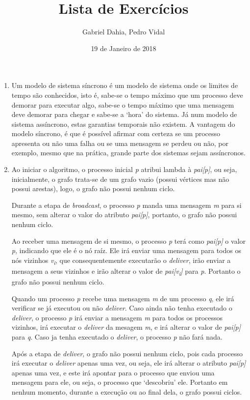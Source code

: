 \documentclass{article}
\title{Lista de Exercícios}
\author{Gabriel Dahia, Pedro Vidal}
\date{19 de Janeiro de 2018}
\begin{document}
 
\maketitle
 
\begin{enumerate}

\item Um modelo de sistema síncrono é um modelo de sistema onde os limites de tempo são conhecidos, isto é, sabe-se o tempo máximo que um processo deve demorar para executar algo, sabe-se o tempo máximo que uma mensagem deve demorar para chegar e sabe-se a `hora' do sistema. Já num modelo de sistema assíncrono, estas garantias temporais não existem. A vantagem do modelo síncrono, é que é possível afirmar com certeza se um processo apresenta ou não uma falha ou se uma mensagem se perdeu ou não, por exemplo, mesmo que na prática, grande parte dos sistemas sejam assíncronos.

\item Ao iniciar o algoritmo, o processo inicial \textit{p} atribui lambda à \textit{pai[p]}, ou seja, inicialmente, o grafo trata-se de um grafo vazio (possui vértices mas não possui arestas), logo, o grafo não possui nenhum ciclo.

Durante a etapa de \textit{broadcast}, o processo \textit{p} manda uma mensagem \textit{m} para si mesmo, sem alterar o valor do atributo \textit{pai[p]}, portanto, o grafo não possui nenhum ciclo.

Ao receber uma mensagem de si mesmo, o processo \textit{p} terá como \textit{pai[p]} o valor \textit{p}, indicando que ele é o nó raíz. Ele irá enviar uma mensagem para todos os nós vizinhos \textit{v\textsubscript{i}}, que consequentemente executarão o \textit{deliver}, irão enviar a mensagem a seus vizinhos e irão alterar o valor de \textit{pai[\textit{v\textsubscript{i}}]} para \textit{p}. Portanto o grafo não possui nenhum ciclo.

Quando um processo \textit{p} recebe uma mensagem \textit{m} de um processo \textit{q}, ele irá verificar se já executou ou não \textit{deliver}. Caso ainda não tenha executado o \textit{deliver}, o processo \textit{p} irá enviar a mensagem \textit{m} para todos os processos vizinhos, irá executar o \textit{deliver} da mesagem \textit{m}, e irá alterar o valor de \textit{pai[p]} para \textit{q}. Caso ja tenha executado o \textit{deliver}, o processo \textit{p} não fará nada.

Após a etapa de \textit{deliver}, o grafo não possui nenhum ciclo, pois cada processo irá executar o \textit{deliver} apenas uma vez, ou seja, ele irá alterar o atributo \textit{pai[p]} apenas uma vez, e este irá apontar para o processo que enviou uma mensagem para ele, ou seja, o processo que `descobriu' ele. Portanto em nenhum momento, durante a execução ou ao final dela, o grafo possui ciclos. 


\end{enumerate}
\end{document}
